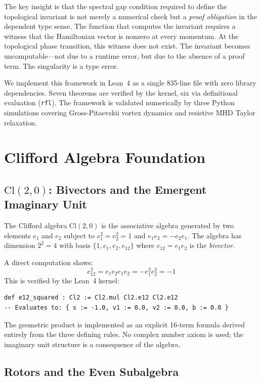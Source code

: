 \documentclass[11pt,a4paper]{article}
\newcommand{\Cl}[1]{\mathrm{Cl}(#1)}
\newcommand{\eone}{e_1}
\newcommand{\etwo}{e_2}
\newcommand{\eonetwo}{e_{12}}
\begin{document}
The key insight is that the spectral gap condition required to define the topological invariant is not merely a numerical check but a \emph{proof obligation} in the dependent type sense. The function that computes the invariant requires a witness that the Hamiltonian vector is nonzero at every momentum. At the topological phase transition, this witness does not exist. The invariant becomes uncomputable---not due to a runtime error, but due to the absence of a proof term. The singularity is a type error.

We implement this framework in Lean~4 as a single 835-line file with zero library dependencies. Seven theorems are verified by the kernel, six via definitional evaluation (\texttt{rfl}). The framework is validated numerically by three Python simulations covering Gross-Pitaevskii vortex dynamics and resistive MHD Taylor relaxation.

\section{Clifford Algebra Foundation}

\subsection{\texorpdfstring{$\Cl{2,0}$}{Cl(2,0)}: Bivectors and the Emergent Imaginary Unit}

The Clifford algebra $\Cl{2,0}$ is the associative algebra generated by two elements $\eone$ and $\etwo$ subject to $\eone^2 = \etwo^2 = 1$ and $\eone\etwo = -\etwo\eone$. The algebra has dimension $2^2 = 4$ with basis $\{1, \eone, \etwo, \eonetwo\}$ where $\eonetwo = \eone\etwo$ is the \emph{bivector}.

A direct computation shows:
\begin{equation}
\eonetwo^2 = \eone\etwo\eone\etwo = -\eone^2\etwo^2 = -1
\end{equation}
This is verified by the Lean~4 kernel:
\begin{lstlisting}
def e12_squared : Cl2 := Cl2.mul Cl2.e12 Cl2.e12
-- Evaluates to: { s := -1.0, v1 := 0.0, v2 := 0.0, b := 0.0 }
\end{lstlisting}

The geometric product is implemented as an explicit 16-term formula derived entirely from the three defining rules. No complex number axiom is used; the imaginary unit structure is a consequence of the algebra.

\subsection{Rotors and the Even Subalgebra}
\end{document}
